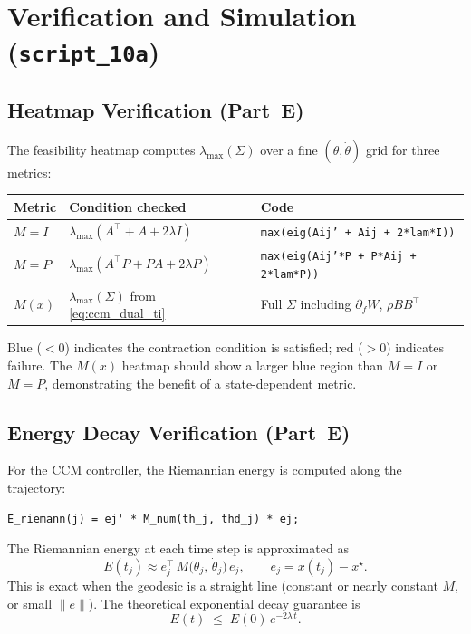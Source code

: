 \documentclass[11pt,a4paper]{article}
\begin{document}
\section{Verification and Simulation (\texttt{script\_10a})}

\subsection{Heatmap Verification (Part~E)}

The feasibility heatmap computes \(\lambda_{\max}(\Sigma)\) over a fine \((\theta, \dot\theta)\) grid for three metrics:

\begin{center}
\begin{tabular}{lll}
\toprule
\textbf{Metric} & \textbf{Condition checked} & \textbf{Code} \\
\midrule
\(M = I\)    & \(\lambda_{\max}(A^\top + A + 2\lambda I)\)  & \texttt{max(eig(Aij' + Aij + 2*lam*I))} \\
\(M = P\)    & \(\lambda_{\max}(A^\top P + PA + 2\lambda P)\) & \texttt{max(eig(Aij'*P + P*Aij + 2*lam*P))} \\
\(M(x)\)     & \(\lambda_{\max}(\Sigma)\) from \eqref{eq:ccm_dual_ti} & Full \(\Sigma\) including \(\partial_f W\), \(\rho BB^\top\) \\
\bottomrule
\end{tabular}
\end{center}

Blue ($< 0$) indicates the contraction condition is satisfied; red ($> 0$) indicates failure.  The \(M(x)\) heatmap should show a larger blue region than \(M = I\) or \(M = P\), demonstrating the benefit of a state-dependent metric.

\subsection{Energy Decay Verification (Part~E)}

For the CCM controller, the Riemannian energy is computed along the trajectory:

\begin{lstlisting}
E_riemann(j) = ej' * M_num(th_j, thd_j) * ej;
\end{lstlisting}

\begin{codemath}
The Riemannian energy at each time step is approximated as
\[
E(t_j) \approx e_j^\top\, M\!\bigl(\theta_j,\,\dot\theta_j\bigr)\, e_j,
\qquad
e_j = x(t_j) - x^\star.
\]
This is exact when the geodesic is a straight line (constant or nearly constant \(M\), or small \(\|e\|\)).
The theoretical exponential decay guarantee is
\[
E(t) \;\le\; E(0)\,e^{-2\lambda\, t}.
\]
\end{codemath}
\end{document}
